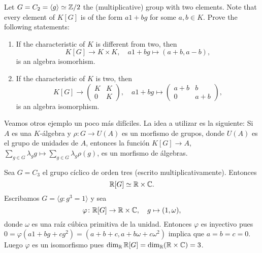 \begin{exercise}
	Let $G=C_2=\langle g\rangle\simeq\mathbb{Z}/2$ the (multiplicative) 
	group with two elements. Note that every element of $K[G]$ is of the form
	$a1+bg$ for some $a,b\in K$. Prove the following statements:
	\begin{enumerate}
	    \item If the characteristic of $K$ is different from two, then 
	    \[
		K[G]\to K\times K,
		\quad
		a1+bg\mapsto (a+b,a-b),
	\]
	is an algebra isomorhism. 
	\item If the characteristic of $K$ is two, then 
	\[
	K[G]\to \begin{pmatrix}
			K & K\\
			0 & K
		\end{pmatrix},
		\quad
		a1+bg\mapsto\begin{pmatrix}
			a+b & b\\
			0 & a+b
		\end{pmatrix},
	\]
	is an algebra isomorphism. 
	\end{enumerate}
\end{exercise}

Veamos otros ejemplo un poco más difíciles. La idea a utilizar es la siguiente:
Si $A$ es una $K$-álgebra y $\rho\colon G\to U(A)$ es un morfismo de grupos,
donde $U(A)$ es el grupo de unidades de $A$, entonces la función $K[G]\to A$,
$\sum_{g\in G}\lambda_gg\mapsto\sum_{g\in G}\lambda_g\rho(g)$, es un morfismo
de álgebras.


\begin{example}
	Sea $G=C_3$ el grupo cíclico de orden tres (escrito multiplicativamente).
	Entonces 
	\[
		\mathbb{R}[G]\simeq\mathbb{R}\times\mathbb{C}.
	\]
	Escribamos $G=\langle g:g^3=1\rangle$ y sea 
	\[
		\varphi\colon\mathbb{R}[G]\to\mathbb{R}\times\mathbb{C},
		\quad
		g\mapsto (1,\omega),
	\]
	donde $\omega$ es una raíz cúbica primitiva de la unidad. Entonces
	$\varphi$ es inyectivo pues
	$0=\varphi(a1+bg+cg^2)=(a+b+c,a+b\omega+c\omega^2)$ implica que $a=b=c=0$.
	Luego $\varphi$ es un isomorfismo pues
	$\dim_{\mathbb{R}}\mathbb{R}[G]=\dim_{\mathbb{R}}(\mathbb{R}\times\mathbb{C})=3$. 
\end{example}


